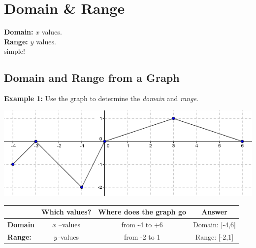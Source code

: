 \documentclass[12pt]{article}
\let\stdsection\section
\renewcommand\section{\newpage\stdsection}
\begin{document}
\section{Domain \& Range}

\textbf{Domain:} $x$ values.\\

\textbf{Range:} $y$ values.\\

\hfill simple!\\

\hrulefill

\subsection{Domain and Range from a Graph}

\textbf{Example 1:} Use the graph to determine the \textit{domain} and \textit{range}.

\begin{center}
\includegraphics[scale=.5]{domain.png}
\end{center}

\bgroup
\def\arraystretch{1.5}

\begin{center}


\begin{tabular}{ l | c | c | c  }

 & Which values? & Where does the graph go & Answer\\ \hline

\textbf{Domain} & $x$ --values & from -4 to +6 & Domain: [-4,6] \\ \hline

\textbf{Range:}  & $y$--values & from -2 to 1 & Range: [-2,1] \\ \hline

\end{tabular}
\end{center}


\vspace{1cm}
\end{document}
